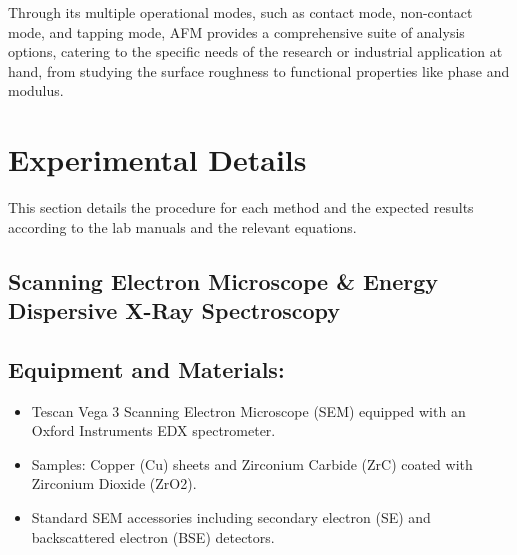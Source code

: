 \documentclass[11pt]{article}
\begin{document}
	Through its multiple operational modes, such as contact mode, non-contact mode, and tapping mode, AFM provides a comprehensive suite of analysis options, catering to the specific needs of the research or industrial application at hand, from studying the surface roughness to functional properties like phase and modulus.
	
\clearpage
	
	\section{Experimental Details}
	
	This section details the procedure for each method and the expected results according to the lab manuals and the relevant equations.
	
	\subsection{Scanning Electron Microscope \& Energy Dispersive X-Ray Spectroscopy}
	
		\subsection*{Equipment and Materials:}
		\begin{itemize}
			\item Tescan Vega 3 Scanning Electron Microscope (SEM) equipped with an Oxford Instruments EDX spectrometer.
			\item Samples: Copper (Cu) sheets and Zirconium Carbide (ZrC) coated with Zirconium Dioxide (ZrO2).
			\item Standard SEM accessories including secondary electron (SE) and backscattered electron (BSE) detectors.
		\end{itemize}
		
\end{document}
